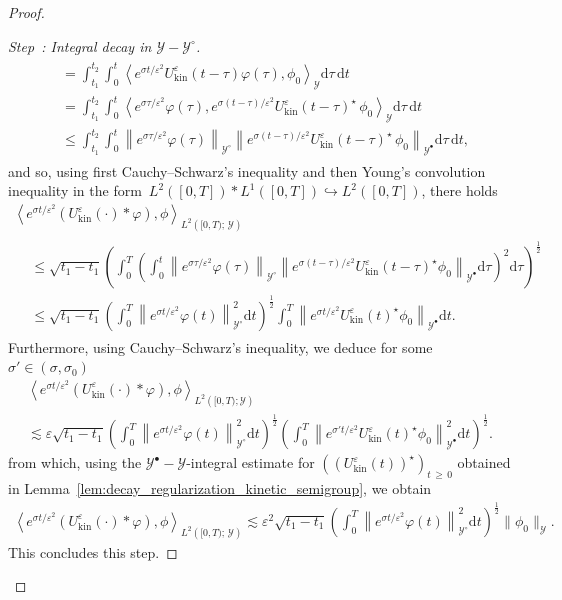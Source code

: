 \documentclass[10pt]{amsart}
\theoremstyle{definition}\newtheorem{defi}[theo]{Definition}\newtheorem{rema}[theo]{Remark}\newtheorem{exam}[theo]{Example}\newtheorem{exem}[theo]{Example}\newtheorem{nota}[theo]{Notation}
\newcommand{\kin}{\mathrm{kin}}
\renewcommand{\d}{\mathrm{d}}
\newcommand{\VV}{\mathcal{Y}}
\newcommand{\SSg}{\VV}
\newcommand{\SSgp}{\VV^{\bullet}}
\newcommand{\SSgm}{\VV^{\circ}}
\renewcommand*\le{\leqslant}
\renewcommand*\geq{\geqslant}
\newcommand*\eps{{\varepsilon}}
\newcommand{\la}{\langle}
\newcommand{\ra}{\rangle}
\newcommand{\lla}{\left\langle}
\newcommand{\rra}{\right\rangle}
\newcounter{stepcount}
\newenvironment{step}[1]{\refstepcounter{stepcount}\begin{proof}[Step~\thestepcount: #1]}{\let\qed\relax\end{proof}}
\begin{document}
\begin{proof}
\begin{step}{{Integral decay in $\SSg-\SSgm$}}
\begin{multline*}
\begin{aligned}
& = \int_{t_1}^{t_2} \int_0^t \lla e^{\sigma t / \eps^2} U^\eps_\kin(t-\tau) \varphi(\tau), \phi_0 \rra_{\SSg} \d \tau \, \d t \\
& = \int_{t_1}^{t_2} \int_0^t \lla e^{\sigma \tau / \eps^2} \varphi(\tau), e^{\sigma (t-\tau) / \eps^2 } U^\eps_\kin(t-\tau)^\star \, \phi_0 \rra_{\SSg} \d \tau \, \d t \\
& \le \int_{t_1}^{t_2} \int_0^t \left\| e^{\sigma \tau / \eps^2 } \varphi(\tau) \right\|_{\SSgm } \left\| e^{\sigma (t-\tau) / \eps^2 } U^\eps_\kin(t-\tau)^\star \, \phi_0 \right\|_{\SSgp} \d \tau \, \d t,
\end{aligned}
\end{multline*}
and so, using first Cauchy--Schwarz's inequality and then Young's convolution inequality in the form~$L^2([0, T] ) \ast L^1([0, T]) \hookrightarrow L^2([0, T])$, there holds
\begin{multline*}
\left\la e^{\sigma t / \eps^2}  (U^\eps_\kin(\cdot) * \varphi), \phi \right\ra_{ L^2\left([0, T) ;\,\SSg \right) } \\
\begin{aligned}
& \le \sqrt{t_1-t_1} \left(\int_{0}^{T} \left(\int_0^t \left\| e^{\sigma \tau / \eps^2} \varphi(\tau) \right\|_{\SSgm } \left\| e^{\sigma (t-\tau) / \eps^2 } U^\eps_\kin(t-\tau)^\star \phi_0 \right\|_{\SSgp} \d \tau \right)^2 \d \tau \right)^{\frac{1}{2}} \\
& \le \sqrt{t_1-t_1} \left(\int_0^T \left\| e^{\sigma t / \eps^2 } \varphi(t) \right\|_{\SSgm }^2 \d t\right)^{\frac{1}{2}} \int_0^T \left\| e^{\sigma t / \eps^2 } U^\eps_\kin(t)^\star \phi_0 \right\|_{\SSgp} \d t.
\end{aligned}
\end{multline*}
Furthermore, using Cauchy--Schwarz's inequality, we deduce for some $\sigma' \in (\sigma, \sigma_0)$
\begin{multline*}
\lla e^{\sigma t / \eps^2}  (U^\eps_\kin(\cdot) * \varphi), \phi \rra_{ L^2\left([0, T) ; \SSg \right) } \\
 \lesssim \eps \sqrt{t_1-t_1} \left(\int_0^T \left\| e^{\sigma t / \eps^2 } \varphi(t) \right\|_{\SSgm }^2 \d t\right)^{\frac{1}{2}} \left(\int_0^T \left\| e^{\sigma' t / \eps^2 } U^\eps_\kin(t)^\star \phi_0 \right\|_{\SSgp}^2 \d t\right)^{\frac{1}{2}}.
\end{multline*}
from which, using the $\SSgp-\SSg$-integral estimate for $((U^\eps_\kin(t))^\star)_{t\,\geq\,0}$ obtained in Lemma~\ref{lem:decay_regularization_kinetic_semigroup}, we obtain
\begin{align*}
\lla e^{\sigma t / \eps^2} (U^\eps_\kin(\cdot) * \varphi), \phi \rra_{ L^2\left([0, T) ;\,\SSg \right) }
 \lesssim \eps^2 \sqrt{t_1-t_1} \left(\int_0^T \left\| e^{\sigma t / \eps^2 } \varphi(t) \right\|_{\SSgm }^2 \d t\right)^{\frac{1}{2}} \| \phi_0 \|_{\SSg}.
\end{align*}
This concludes this step.
\end{step}


\end{proof}
\end{document}

